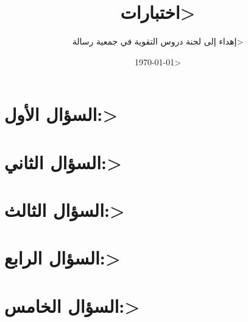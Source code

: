 \documentclass[a4paper,14pt]{article}
\title{\<اختبارات>}
\author{\<إهداء إلى لجنة دروس التقوية في جمعية رسالة>}
\date{\<\today>}
\begin{document}
\maketitle
\section{\<السؤال الأول:>}
\section{\<السؤال الثاني:>}
\section{\<السؤال الثالث:>}
\section{\<السؤال الرابع:>}
\section{\<السؤال الخامس:>}
\end{document}
